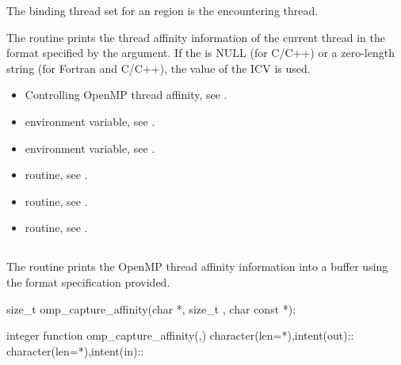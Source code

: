 \binding
The binding thread set for an  region is the encountering thread.

\effect
The  routine prints the thread affinity information of the current thread in the format
specified by the  argument. If the  is NULL (for C/C++) or a zero-length string
(for Fortran and C/C++), the value of the  ICV is used.

\crossreferences
\begin{itemize}
\item Controlling OpenMP thread affinity, see 
. 
\item {} environment variable, see 
.
\item {} environment variable, see 
.
\item {} routine, see .
\item {} routine, see .
\item {} routine, see .
\end{itemize}


\subsection{}
\label{subsec:omp_capture_affinity}

\summary
The  routine prints the OpenMP thread affinity information into a buffer using
the format specification provided.

\format
\begin{ccppspecific}
\begin{boxedcode}
size_t omp\_capture\_affinity(char *, size_t ,
                              char const *);
\end{boxedcode}
\end{ccppspecific}

\begin{fortranspecific}
\begin{boxedcode}
integer function omp\_capture\_affinity(,)
character(len=*),intent(out)::
character(len=*),intent(in)::
\end{boxedcode}
\end{fortranspecific}

